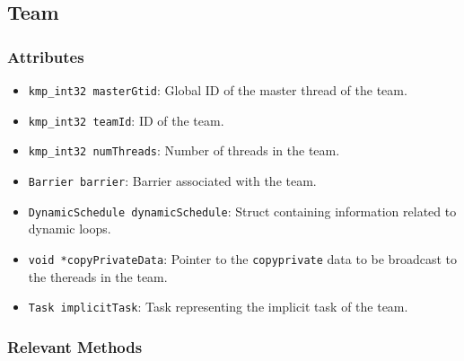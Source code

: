 \subsection{Team}
\label{subsec:team}

\subsubsection{Attributes}

\begin{itemize}
	\item \texttt{kmp_int32 masterGtid}: Global ID of the master thread of the team.
	\item \texttt{kmp_int32 teamId}: ID of the team.
	\item \texttt{kmp_int32 numThreads}: Number of threads in the team.
	\item \texttt{Barrier barrier}: Barrier associated with the team.
	\item \texttt{DynamicSchedule dynamicSchedule}: Struct containing information related to dynamic
	      loops.
	\item \texttt{void *copyPrivateData}: Pointer to the \texttt{copyprivate} data to be
	      broadcast to the thereads in the team.
	\item \texttt{Task implicitTask}: Task representing the implicit task of the team.
\end{itemize}

\subsubsection{Relevant Methods}

